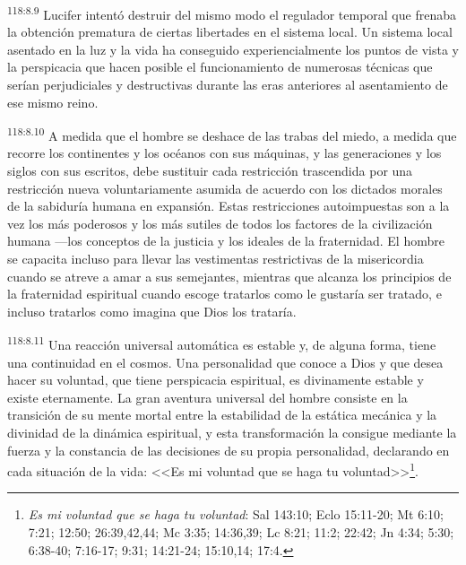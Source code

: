 \par
\textsuperscript{118:8.9} Lucifer intentó destruir del mismo modo el regulador temporal que frenaba la obtención prematura de ciertas libertades en el sistema local. Un sistema local asentado en la luz y la vida ha conseguido experiencialmente los puntos de vista y la perspicacia que hacen posible el funcionamiento de numerosas técnicas que serían perjudiciales y destructivas durante las eras anteriores al asentamiento de ese mismo reino.

\par
\textsuperscript{118:8.10} A medida que el hombre se deshace de las trabas del miedo, a medida que recorre los continentes y los océanos con sus máquinas, y las generaciones y los siglos con sus escritos, debe sustituir cada restricción trascendida por una restricción nueva voluntariamente asumida de acuerdo con los dictados morales de la sabiduría humana en expansión. Estas restricciones autoimpuestas son a la vez los más poderosos y los más sutiles de todos los factores de la civilización humana ---los conceptos de la justicia y los ideales de la fraternidad. El hombre se capacita incluso para llevar las vestimentas restrictivas de la misericordia cuando se atreve a amar a sus semejantes, mientras que alcanza los principios de la fraternidad espiritual cuando escoge tratarlos como le gustaría ser tratado, e incluso tratarlos como imagina que Dios los trataría.

\par
\textsuperscript{118:8.11} Una reacción universal automática es estable y, de alguna forma, tiene una continuidad en el cosmos. Una personalidad que conoce a Dios y que desea hacer su voluntad, que tiene perspicacia espiritual, es divinamente estable y existe eternamente. La gran aventura universal del hombre consiste en la transición de su mente mortal entre la estabilidad de la estática mecánica y la divinidad de la dinámica espiritual, y esta transformación la consigue mediante la fuerza y la constancia de las decisiones de su propia personalidad, declarando en cada situación de la vida: <<Es mi voluntad que se haga tu voluntad>>\footnote{\textit{Es mi voluntad que se haga tu voluntad}: Sal 143:10; Eclo 15:11-20; Mt 6:10; 7:21; 12:50; 26:39,42,44; Mc 3:35; 14:36,39; Lc 8:21; 11:2; 22:42; Jn 4:34; 5:30; 6:38-40; 7:16-17; 9:31; 14:21-24; 15:10,14; 17:4.}.


